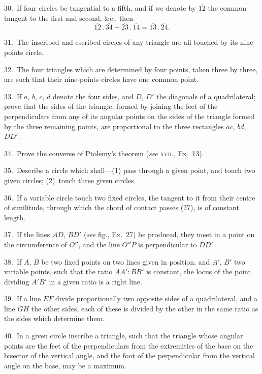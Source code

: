 \documentclass[oneside]{book}
\begin{document}
\begin{footnotesize}
30.~If four circles be tangential to a fifth, and if we denote by
$\overline{12}$ the common tangent to the first and second, \&c., then
\[
  \overline{12} \,.\, \overline{34}
+ \overline{23} \,.\, \overline{14}
= \overline{13} \,.\, \overline{24}.
\]

31.~The inscribed and escribed circles of any triangle are all
touched by its nine-points circle.

32.~The four triangles which are determined by four points,
taken three by three, are such that their nine-points circles
have one common point.

33.~If $a$, $b$, $c$, $d$ denote the four sides, and $D$, $D'$ the diagonals
of a quadrilateral; prove that the sides of the triangle, formed by
joining the feet of the perpendiculars from any of its angular
points on the sides of the triangle formed by the three remaining
points, are proportional to the three rectangles $ac$, $bd$, $DD'$.

34.~Prove the converse of Ptolemy's theorem (\emph{see} \textsc{xvii.}, Ex.~13).

35.~Describe a circle which shall---(1) pass through a given
point, and touch two given circles; (2)~touch three given
circles.

36.~If a variable circle touch two fixed circles, the tangent to
it from their centre of similitude, through which the chord of contact
passes (27), is of constant length.

37.~If the lines $AD$, $BD'$ (\emph{see} fig., Ex.~27) be produced, they
meet in a point on the circumference of $O''$, and the line $O''P$ is
perpendicular to $DD'$.

38.~If $A$, $B$ be two fixed points on two lines given in position,
and $A'$, $B'$ two variable points, such that the ratio $AA' : BB'$ is
constant, the locus of the point dividing $A'B'$ in a given ratio is a
right line.

39.~If a line $EF$ divide proportionally two opposite sides of a
quadrilateral, and a line $GH$ the other sides, each of these is
divided by the other in the same ratio as the sides which determine
them.

40.~In a given circle inscribe a triangle, such that the triangle
whose angular points are the feet of the perpendiculars from the
extremities of the base on the bisector of the vertical angle, and
the foot of the perpendicular from the vertical angle on the base,
may be a maximum.


\end{footnotesize}
\end{document}
